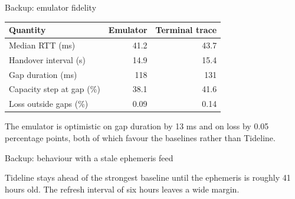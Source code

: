 \documentclass[aspectratio=169,10pt]{beamer}
\newcommand{\sysname}{Tideline}
\begin{document}
\begin{frame}{Backup: emulator fidelity}
  \begin{table}
    \centering
    \small
    \begin{tabular}{lrr}
      \toprule
      Quantity & Emulator & Terminal trace \\
      \midrule
      Median RTT (ms)            & 41.2  & 43.7 \\
      Handover interval (s)      & 14.9  & 15.4 \\
      Gap duration (ms)          & 118   & 131 \\
      Capacity step at gap (\%)  & 38.1  & 41.6 \\
      Loss outside gaps (\%)     & 0.09  & 0.14 \\
      \bottomrule
    \end{tabular}
  \end{table}
  \vspace{0.4em}
  \footnotesize
  The emulator is optimistic on gap duration by 13 ms and on loss by 0.05 percentage points, both
  of which favour the baselines rather than \sysname.
\end{frame}

\begin{frame}{Backup: behaviour with a stale ephemeris feed}
  \label{fig:fallback}
  \centering

  \vspace{0.3em}
  \footnotesize
  \sysname{} stays ahead of the strongest baseline until the ephemeris is roughly 41 hours old.
  The refresh interval of six hours leaves a wide margin.
\end{frame}
\end{document}
